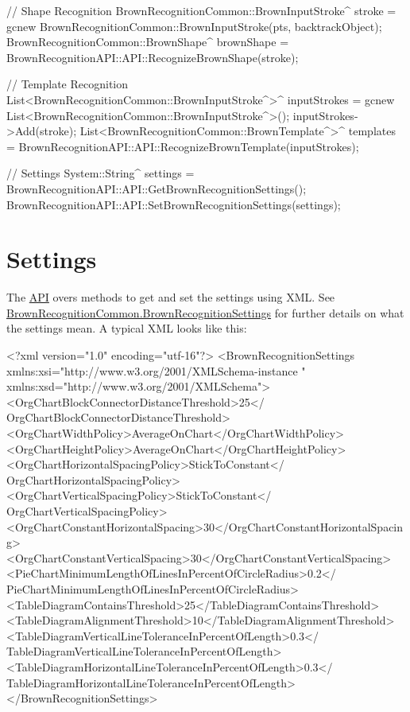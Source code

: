 \begin{DoxyCode}
 // Shape Recognition
 BrownRecognitionCommon::BrownInputStroke^ stroke = gcnew 
      BrownRecognitionCommon::BrownInputStroke(pts, backtrackObject);
 BrownRecognitionCommon::BrownShape^ brownShape = 
      BrownRecognitionAPI::API::RecognizeBrownShape(stroke);
 
 // Template Recognition
 List<BrownRecognitionCommon::BrownInputStroke^>^ inputStrokes = gcnew 
      List<BrownRecognitionCommon::BrownInputStroke^>();
 inputStrokes->Add(stroke);
 List<BrownRecognitionCommon::BrownTemplate^>^ templates = 
      BrownRecognitionAPI::API::RecognizeBrownTemplate(inputStrokes);
 
 // Settings
 System::String^ settings = 
      BrownRecognitionAPI::API::GetBrownRecognitionSettings();
 BrownRecognitionAPI::API::SetBrownRecognitionSettings(settings);
\end{DoxyCode}
\hypertarget{index_c}{}\section{\-Settings}\label{index_c}
\-The \hyperlink{class_brown_recognition_a_p_i_1_1_a_p_i}{\-A\-P\-I} overs methods to get and set the settings using \-X\-M\-L. \-See \hyperlink{class_brown_recognition_common_1_1_brown_recognition_settings}{\-Brown\-Recognition\-Common.\-Brown\-Recognition\-Settings} for further details on what the settings mean. \-A typical \-X\-M\-L looks like this\-: 
\begin{DoxyCode}
 <?xml version="1.0" encoding="utf-16"?>
 <BrownRecognitionSettings xmlns:xsi="http://www.w3.org/2001/XMLSchema-instance
      " xmlns:xsd="http://www.w3.org/2001/XMLSchema">
   <OrgChartBlockConnectorDistanceThreshold>25</
      OrgChartBlockConnectorDistanceThreshold>
   <OrgChartWidthPolicy>AverageOnChart</OrgChartWidthPolicy>
   <OrgChartHeightPolicy>AverageOnChart</OrgChartHeightPolicy>
   <OrgChartHorizontalSpacingPolicy>StickToConstant</
      OrgChartHorizontalSpacingPolicy>
   <OrgChartVerticalSpacingPolicy>StickToConstant</
      OrgChartVerticalSpacingPolicy>
   <OrgChartConstantHorizontalSpacing>30</OrgChartConstantHorizontalSpacing>
   <OrgChartConstantVerticalSpacing>30</OrgChartConstantVerticalSpacing>
   <PieChartMinimumLengthOfLinesInPercentOfCircleRadius>0.2</
      PieChartMinimumLengthOfLinesInPercentOfCircleRadius>
   <TableDiagramContainsThreshold>25</TableDiagramContainsThreshold>
   <TableDiagramAlignmentThreshold>10</TableDiagramAlignmentThreshold>
   <TableDiagramVerticalLineToleranceInPercentOfLength>0.3</
      TableDiagramVerticalLineToleranceInPercentOfLength>
   <TableDiagramHorizontalLineToleranceInPercentOfLength>0.3</
      TableDiagramHorizontalLineToleranceInPercentOfLength>
 </BrownRecognitionSettings>
\end{DoxyCode}
 